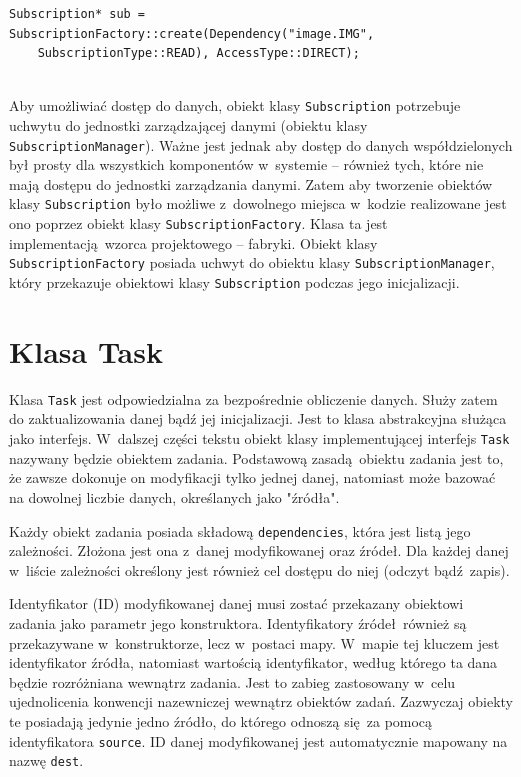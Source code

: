 \begin{minipage}{\textwidth}
	\begin{lstlisting}[label=subscription:direct, caption={Przykład tworzenia obiektu klasy \lstinline$Subscription$ z~bezpośrednim dostępem do danych },alsoletter={()[].=}]
Subscription* sub = SubscriptionFactory::create(Dependency("image.IMG",
	SubscriptionType::READ), AccessType::DIRECT);
	
	\end{lstlisting}
\end{minipage}

Aby umożliwiać dostęp do danych, obiekt klasy \lstinline$Subscription$ potrzebuje uchwytu do jednostki zarządzającej danymi (obiektu klasy \lstinline$SubscriptionManager$). Ważne jest jednak aby dostęp do danych współdzielonych był prosty dla wszystkich komponentów w~systemie -- również tych, które nie mają dostępu do jednostki zarządzania danymi. Zatem aby tworzenie obiektów klasy \lstinline$Subscription$ było możliwe z~dowolnego miejsca w~kodzie realizowane jest ono poprzez obiekt klasy \lstinline$SubscriptionFactory$. Klasa ta jest implementacją wzorca projektowego -- fabryki. Obiekt klasy \lstinline$SubscriptionFactory$ posiada uchwyt do obiektu klasy \lstinline$SubscriptionManager$, który przekazuje obiektowi klasy \lstinline$Subscription$ podczas jego inicjalizacji. 

\section{Klasa Task}
Klasa \lstinline$Task$ jest odpowiedzialna za bezpośrednie obliczenie danych. Służy zatem do zaktualizowania danej bądź jej inicjalizacji. Jest to klasa abstrakcyjna służąca jako interfejs. W~dalszej części tekstu obiekt klasy implementującej interfejs \lstinline$Task$ nazywany będzie obiektem zadania. Podstawową zasadą obiektu zadania jest to, że zawsze dokonuje on modyfikacji tylko jednej danej, natomiast może bazować na dowolnej liczbie danych, określanych jako "źródła". 

Każdy obiekt zadania posiada składową \lstinline$dependencies$, która jest listą jego zależności. Złożona jest ona z~danej modyfikowanej oraz źródeł. Dla każdej danej w~liście zależności określony jest również cel dostępu do niej (odczyt bądź zapis).

Identyfikator (ID) modyfikowanej danej musi zostać przekazany obiektowi zadania jako parametr jego konstruktora. Identyfikatory źródeł również są przekazywane w~konstruktorze, lecz w~postaci mapy. W~mapie tej kluczem jest identyfikator źródła, natomiast wartością identyfikator, według którego ta dana będzie rozróżniana wewnątrz zadania. Jest to zabieg zastosowany w~celu ujednolicenia konwencji nazewniczej wewnątrz obiektów zadań. Zazwyczaj obiekty te posiadają jedynie jedno źródło, do którego odnoszą się za pomocą identyfikatora \lstinline$source$. ID danej modyfikowanej jest automatycznie mapowany na nazwę \lstinline$dest$. 

